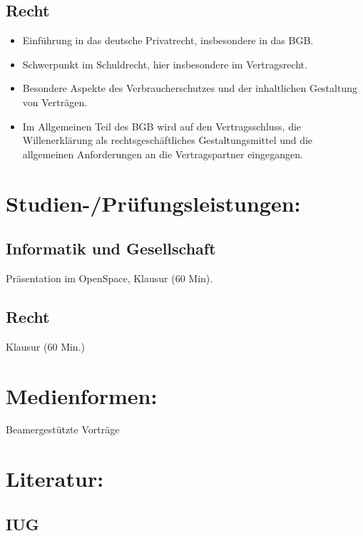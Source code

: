 \subsection*{Recht}\label{recht}

\begin{itemize}
\item
  Einführung in das deutsche Privatrecht, insbesondere in das BGB.
\item
  Schwerpunkt im Schuldrecht, hier insbesondere im Vertragsrecht.
\item
  Besondere Aspekte des Verbraucherschutzes und der inhaltlichen
  Gestaltung von Verträgen.
\item
  Im Allgemeinen Teil des BGB wird auf den Vertragsschluss, die
  Willenerklärung als rechtsgeschäftliches Gestaltungsmittel und die
  allgemeinen Anforderungen an die Vertragspartner eingegangen.
\end{itemize}

\section*{Studien-/Prüfungsleistungen:}\label{studien-pruxfcfungsleistungen-14}

\subsection*{Informatik und
Gesellschaft}\label{informatik-und-gesellschaft-1}

Präsentation im OpenSpace, Klausur (60 Min).

\subsection*{Recht}\label{recht-1}

Klausur (60 Min.)

\section*{Medienformen:}\label{medienformen-9}

Beamergestützte Vorträge

\section*{Literatur:}\label{literatur-13}

\subsection*{IUG}\label{iug}

